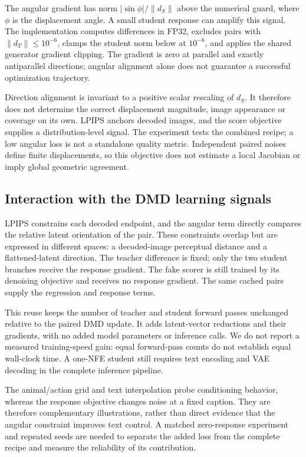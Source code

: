 \documentclass[10pt,twocolumn,letterpaper]{article}
\begin{document}
The angular gradient has norm $|\sin\phi|/\|d_S\|$ above the numerical guard,
where $\phi$ is the displacement angle. A small student response can amplify
this signal. The implementation computes differences in FP32, excludes
pairs with $\|d_T\|\leq10^{-6}$, clamps the student norm below at $10^{-6}$,
and applies the shared generator gradient clipping. The gradient is zero
at parallel and exactly antiparallel directions; angular alignment alone
does not guarantee a successful optimization trajectory.

Direction alignment is invariant to a positive scalar rescaling of $d_S$.
It therefore does not determine the correct displacement magnitude, image
appearance or coverage on its own. LPIPS anchors decoded images, and the
score objective supplies a distribution-level signal. The experiment tests
the combined recipe; a low angular loss is not a standalone quality metric.
Independent paired noises define finite displacements, so this objective
does not estimate a local Jacobian or imply global geometric agreement.

\subsection{Interaction with the DMD learning signals}
LPIPS constrains each decoded endpoint, and the angular term directly
compares the relative latent orientation of the pair. These constraints
overlap but are expressed in different spaces: a decoded-image perceptual
distance and a flattened-latent direction. The teacher difference is fixed;
only the two student branches receive the response gradient. The fake
scorer is still trained by its denoising objective and receives no response
gradient. The same cached pairs supply the regression and response terms.

This reuse keeps the number of teacher and student forward passes unchanged
relative to the paired DMD update. It adds latent-vector reductions and
their gradients, with no added model parameters or inference calls. We
do not report a measured training-speed gain: equal forward-pass counts
do not establish equal wall-clock time. A one-NFE student still requires
text encoding and VAE decoding in the complete inference pipeline.

The animal/action grid and text interpolation probe conditioning behavior,
whereas the response objective changes noise at a fixed caption. They are
therefore complementary illustrations, rather than direct evidence that
the angular constraint improves text control. A matched zero-response
experiment and repeated seeds are needed to separate the added loss from
the complete recipe and measure the reliability of its contribution.



\end{document}

